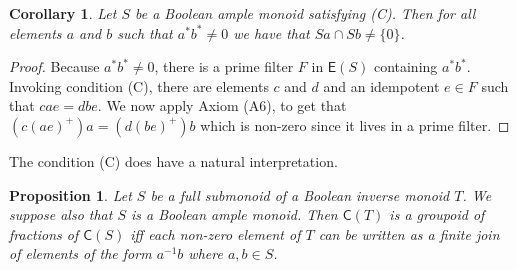 \documentclass[a4paper]{amsart}
\newtheorem{corollary}[theorem]{Corollary}
\newtheorem{proposition}[theorem]{Proposition}
\begin{document}
\begin{corollary} Let $S$ be a Boolean ample monoid satisfying (C).
Then for all elements $a$ and $b$ such that $a^{\ast}b^{\ast} \neq 0$
we have that $Sa \cap Sb \neq \{0\}$.
\end{corollary}
\begin{proof} Because $a^{\ast}b^{\ast} \neq 0$, there is a prime filter $F$ in $\mathsf{E}(S)$ containing $a^{\ast}b^{\ast}$.
Invoking condition (C), there are elements $c$ and $d$ and an idempotent $e \in F$ such that
$cae = dbe$.
We now apply Axiom (A6), to get that
$(c(ae)^{+})a = (d(be)^{+})b$ which is non-zero since it lives in a prime filter.
\end{proof} 


The condition (C) does have a natural interpretation.

\begin{proposition}\label{prop:homuz} Let $S$ be a full submonoid of a Boolean inverse monoid $T$.
We suppose also that $S$ is a Boolean ample monoid.
Then $\mathsf{C}(T)$ is a groupoid of fractions of $\mathsf{C}(S)$ iff
each non-zero element of $T$ can be written as a finite join of elements of the form $a^{-1}b$
where $a,b \in S$.
\end{proposition}
\end{document}
